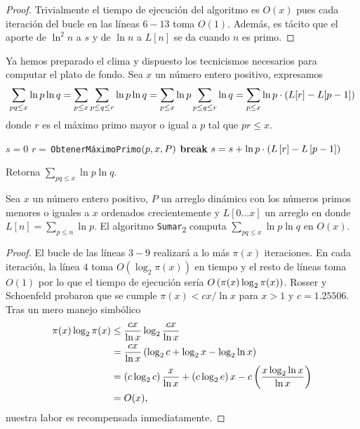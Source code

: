\begin{proof}
    Trivialmente el tiempo de ejecuci\'on del algoritmo es \(O(x)\) pues
    cada iteraci\'on del bucle en las l\'ineas \(6-13\) toma \(O(1)\).
    Adem\'as, es t\'acito que el aporte de \(\ln^2 n\) a \(s\) y de \(\ln n\) a \(L[n]\)
    se da cuando \(n\) es primo.
\end{proof}

Ya hemos preparado el clima
y dispuesto los tecnicismos necesarios para
computar el plato de fondo.
Sea \(x\) un n\'umero entero positivo, expresamos
\[
    \sum_{pq \leq x} \ln p \ln q
    = \sum_{p \leq x} \sum_{p \leq q \leq r} \ln p \ln q
    = \sum_{p \leq x} \ln p \sum_{p \leq q \leq r} \ln q
    = \sum_{p \leq x} \ln p \cdot \left( L[r] - L[p - 1] \right)
\]
donde \(r\) es el m\'aximo primo mayor o igual a \(p\) tal que \(pr \leq x\).

\begin{algorithm}[H]
    \SetAlgoLined
    \DontPrintSemicolon
     {
        \(s = 0\)\;
         {
            \(r =\,\)\texttt{ObtenerM\'aximoPrimo}\(\left( p, x, P \right)\)\;
             {
                \textbf{break}\;
            }
            \(s = s + \ln p \cdot \left( L\left[ r \right] - L\left[ p - 1 \right] \right)\)\;
        }
    }
    \caption{Retorna \(\sum_{pq \leq x} \ln p \ln q\).}
\end{algorithm}

\begin{theorem}
    \label{thm:sum-2}
    Sea \(x\) un n\'umero entero positivo,
    \(P\) un arreglo din\'amico con los n\'umeros primos menores o iguales a \(x\) ordenados crecientemente y
    \(L[0 \dots x]\) un arreglo en donde \(L[n] = \sum_{p \leq n} \ln p\).
    El algoritmo \texttt{Sumar}\textsubscript{2} computa \(\sum_{pq \leq x} \ln p \ln q\) en \(O(x)\).
\end{theorem}

\begin{proof}
    El bucle de las l\'ineas \(3-9\) realizar\'a a lo m\'as \(\pi(x)\) iteraciones.
    En cada iteraci\'on, la l\'inea \(4\) toma \(O(\log_2\pi(x))\) en tiempo
    y el resto de l\'ineas toma \(O(1)\) por lo que el tiempo de ejecuci\'on ser\'ia
    \(O\left( \pi(x) \log_2\pi(x) \right)\).
    Rosser y Schoenfeld \cite[corolario 1]{Rosser1962} probaron que se cumple
    \(\pi(x) < cx / \ln x\) para \(x > 1\) y \(c = 1.25506\).
    Tras un mero manejo simb\'olico
    \begin{align*}
        \pi(x) \log_2 \pi(x) &\leq \frac{cx}{\ln x} \log_2 \frac{cx}{\ln x} \\
        &= \frac{cx}{\ln x} \left( \log_2 c + \log_2 x - \log_2 \ln x \right) \\
        &= \left( c \log_2 c \right)\frac{x}{\ln x} + \left( c \log_2 e \right)x - c\left( \frac{x \log_2 \ln x}{\ln x} \right) \\
        &= O(x),
    \end{align*}
    nuestra labor es recompensada inmediatamente.
\end{proof}

